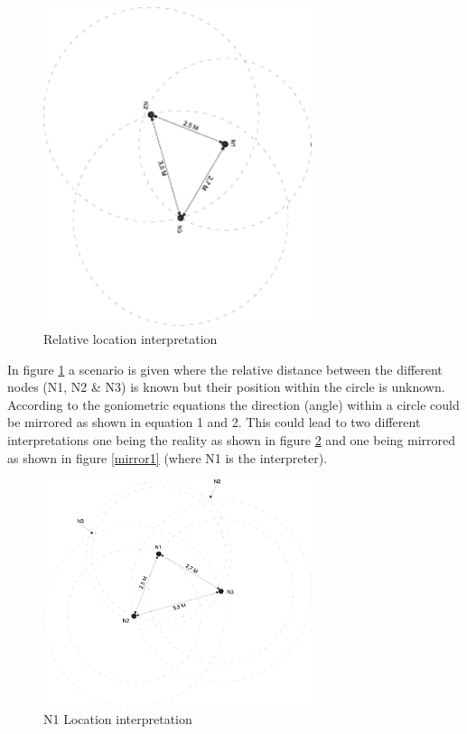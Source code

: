 \documentclass[10pt,a4paper]{article}
\begin{document}
\begin{figure}[H]
\centering
\includegraphics[angle=90,width=0.7\textwidth]{Detectie.pdf}
\caption{Relative location interpretation}
\label{detectie}
\end{figure}

In figure \ref{detectie} a scenario is given where the relative distance between the different nodes (N1, N2 \& N3) is known but their position within the circle is unknown. According to the goniometric equations the direction (angle) within a circle could be mirrored as shown in equation 1 and 2. This could lead to two different interpretations one being the reality as shown in figure \ref{mirror} and one being mirrored as shown in figure \ref{mirror1} (where N1 is the interpreter). 

\begin{figure}[H]
\centering
\includegraphics[width=0.7\textwidth]{Mirror1.pdf}
\caption{N1 Location interpretation}
\label{mirror}
\end{figure}
\end{document}
